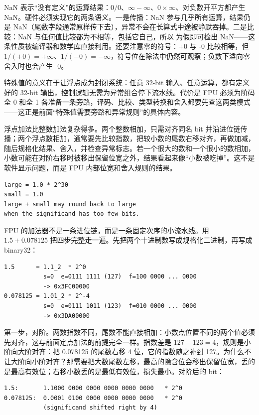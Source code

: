 NaN 表示“没有定义”的运算结果：$0/0$、$\infty - \infty$、$0 \times \infty$、对负数开平方都产生 NaN。硬件必须实现它的两条语义。一是传播：NaN 参与几乎所有运算，结果仍是 NaN（尾数字段通常原样传下去），异常不会在长算式中途被静默吞掉。二是比较：NaN 与任何值比较都为不相等，包括它自己，所以  为假即可检出 NaN——这条性质被编译器和数学库直接利用。还要注意零的符号：+0 与 -0 比较相等，但 $1/(+0) = +\infty$、$1/(-0) = -\infty$，符号位在除法中仍然可观察；负数下溢向零舍入时也会产生 -0。

特殊值的意义在于让浮点成为封闭系统：任意 32-bit 输入、任意运算，都有定义好的 32-bit 输出，控制逻辑无需为异常组合停下流水线。代价是 FPU 必须为阶码全 0 和全 1 各准备一条旁路，译码、比较、类型转换和舍入都要先查这两类模式——这正是前面“特殊值需要旁路和异常规则”的具体内容。

浮点加法比整数加法复杂得多。两个整数相加，只需对齐同名 bit 并沿进位链传播；两个浮点数相加，通常要先比较指数，把较小数的尾数右移对齐，再做加减，随后规格化结果、舍入，并检查异常标志。若一个很大的数和一个很小的数相加，小数可能在对阶右移时被移出保留位宽之外，结果看起来像“小数被吃掉”。这不是软件显示问题，而是 FPU 内部位宽和舍入规则的结果。

\begin{lstlisting}
large = 1.0 * 2^30
small = 1.0
large + small may round back to large
when the significand has too few bits.
\end{lstlisting}

FPU 的加法器不是一条进位链，而是一条固定次序的小流水线。用 $1.5 + 0.078125$ 把四步完整走一遍。先把两个十进制数写成规格化二进制，再写成 binary32：

\begin{lstlisting}
1.5      = 1.1_2  * 2^0
           s=0  e=0111 1111 (127)  f=100 0000 ... 0000
           -> 0x3FC00000
0.078125 = 1.01_2 * 2^-4
           s=0  e=0111 1011 (123)  f=010 0000 ... 0000
           -> 0x3DA00000
\end{lstlisting}

第一步，对阶。两数指数不同，尾数不能直接相加：小数点位置不同的两个值必须先对齐，这与前面定点加法的前提完全一样。指数差是 $127 - 123 = 4$，规则是小阶向大阶对齐：把 0.078125 的尾数右移 4 位，它的指数随之补到 127。为什么不让大阶向小阶对齐？那需要把大数尾数左移，最高的隐含位会移出保留位宽，丢的是最高有效位；右移小数丢的是最低有效位，损失最小。对阶后的 bit：

\begin{lstlisting}
1.5:       1.1000 0000 0000 0000 0000 0000   * 2^0
0.078125:  0.0001 0100 0000 0000 0000 0000   * 2^0
           (significand shifted right by 4)
\end{lstlisting}

